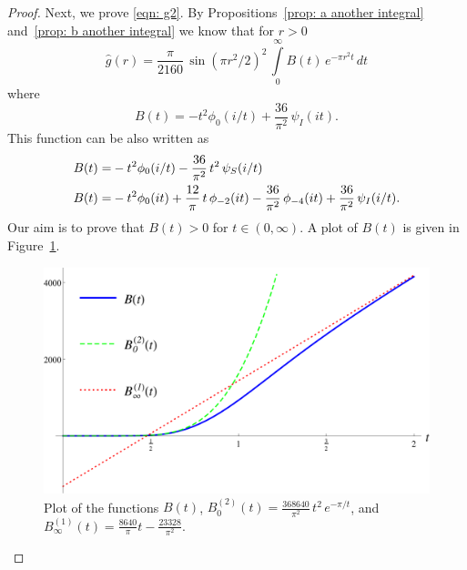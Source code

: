 \begin{proof}
Next, we prove \eqref{eqn: g2}. By Propositions~\ref{prop: a another integral} and~\ref{prop: b another integral} we know that for $r>0$
\begin{equation}\label{eqn: g B} \widehat{g}(r)=\frac{\pi}{2160}\,\sin(\pi r^2/2)^2\,\int\limits_0^\infty B(t)\,e^{-\pi r^2 t}\,dt\end{equation}
where $$B(t)=-t^2\phi_0(i/t)+\frac{36}{\pi^2}\,\psi_I(it).$$
This function can be also written as
\begin{align}
  B(t)=&-t^2\phi_0(i/t)-\frac{36}{\pi^2}\,t^2\,\psi_S(i/t)\notag\\
  B(t)=&-t^2\phi_0(it)+\frac{12}{\pi}\,t\,\phi_{-2}(it)-\frac{36}{\pi^2}\,\phi_{-4}(it)+\frac{36}{\pi^2}\,\psi_I(i/t).\notag
\end{align}
Our aim is to prove that $B(t)>0$ for $t\in(0,\infty)$. A plot of $B(t)$ is given in Figure~\ref{fig:B}.
\begin{figure}[h!]
\caption{Plot of the functions $B(t)$, $B^{(2)}_0(t)=\frac{368640}{\pi^2}\,t^2\,e^{-\pi /t}$, and $B^{(1)}_\infty(t)=\frac{8640}{\pi}t-\frac{23328}{\pi^2}$.\label{fig:B}}
  \centering
\includegraphics[width=300 pt]{graphics/e8plot_B.pdf}
\end{figure}


\end{proof}
